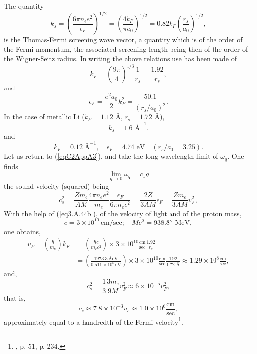 The quantity
\begin{equation}\label{eq3.A.43}
k_s=\left(\frac{6\pi n_ee^2}{\epsilon_F}\right)^{1/2}=\left(\frac{4k_F}{\pi a_0}\right)^{1/2}=0.82 k_F\left(\frac{r_s}{a_0}\right)^{1/2},
\end{equation}
is the Thomas-Fermi screening wave vector, a quantity which is of the order of the Fermi momentum, the associated screening length being then of the order of the Wigner-Seitz radius. In writing the above relations use has been made of
\begin{equation}\label{eq3.A.44b}
k_F=\left(\frac{9\pi}{4}\right)^{1/3}\frac{1}{r_s}=\frac{1.92}{r_s},
\end{equation}
and
\begin{equation}\label{eq3.A.44}
\epsilon_F=\frac{e^2a_0}{2}k_F^2=\frac{50.1}{(r_s/a_0)^2}.
\end{equation}
 In the case of metallic Li ($k_F=1.12$ \AA, $r_s=1.72$ \AA),
\begin{equation}\label{eq3.A.45}
k_s=1.6\text{ \AA}^{-1}.
\end{equation}
and
\begin{equation}\label{eq4.8.46}
k_F=0.12\text{ \AA}^{-1},\quad \epsilon_F=4.74\text{ eV}\quad(r_s/a_0=3.25).
\end{equation}
 Let us return to (\ref{eqC2AppA3}), and take the long wavelength limit of $\omega_q$. One finds
\begin{equation}\label{eq3.A.46}
\lim_{q\to0}\omega_q=c_sq
\end{equation}
 the sound velocity (squared) being 
\begin{equation}\label{eqC2AppA8}
c_s^2=\frac{Zm_e}{AM}\frac{4\pi n_ee^2}{m_e}\frac{\epsilon_F}{6\pi n_e e^2}=\frac{2Z}{3 AM}\epsilon_F=\frac{Zm_e}{3 AM}v_F^2,
\end{equation}
With the help of (\ref{eq3.A.44b}), of the velocity of light and of the proton mass,
\begin{equation}\label{eqC2AppA10}
c=3\times 10^{10}\,\text{cm/sec};\quad Mc^2=938.87\text{ MeV},
\end{equation}
one obtains,
\begin{align}\label{eqC2AppA11}
\nonumber v_F=\left(\frac{\hbar}{m_e}\right)k_F&
=\left(\frac{\hbar c}{m_e c^2}\right)\times 3\times 10^{10}\frac{\text{cm}}{\text{sec}}\frac{1.92}{r_s}\\
&=\left(\frac{1973.3\,\text{\AA eV}}{0.511\times 10^6\,\text{eV}}\right)\times 3\times 10^{10}\frac{\text{cm}}{\text{sec}}\frac{1.92}{1.72\text{ \AA}}
\approx 1.29\times 10^8 \frac{\text{cm}}{\text{sec}},
\end{align}
and,
\begin{equation}\label{eqC2AppA12}
c_s^2=\frac{1}{3}\frac{3m_e}{9M}v_F^2\approx 6\times 10^{-5}v_F^2,
\end{equation}
that is,
\begin{equation}\label{eqC2AppA13}
c_s\approx 7.8\times 10^{-3}v_F\approx 1.0\times 10^6 \frac{\text{cm}}{\text{sec}},
\end{equation}
approximately equal to a hundredth of the Fermi velocity\footnote{\cite{Ashcroft:87}, p. 51, \cite{Ketterson:99} p. 234.}.



